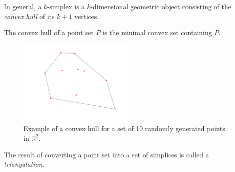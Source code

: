 In general, a $k$-simplex is a $k$-dimensional geometric object consisting of the \emph{convex hull} of its $k + 1$ vertices.


\begin{definition}
The convex hull of a point set $P$ is the minimal convex set containing $P$.
\end{definition}
\begin{figure}[ht]
    \centering
    \includegraphics[width=0.5\textwidth]{report/Images/Theory/convex_hull.png}
    \caption[Example of a convex hull]{Example of a convex hull for a set of 10 randomly generated points in $\mathbb{R}^2$.}
    \label{fig:ex:convex_hull}
\end{figure}

The result of converting a point set into a set of simplices is called a \emph{triangulation}.

